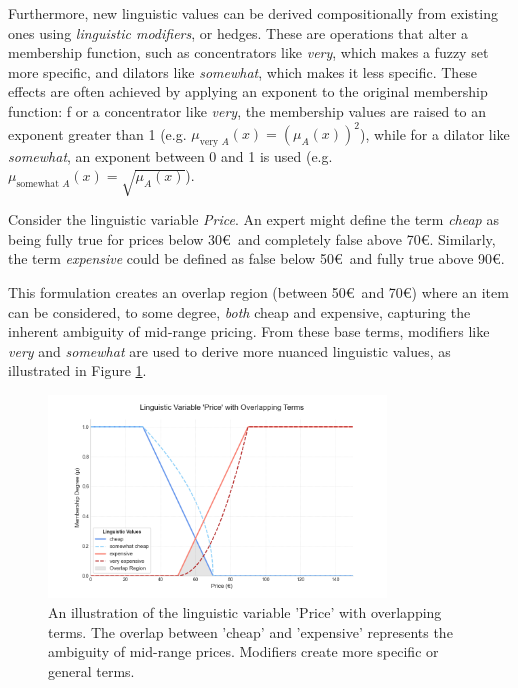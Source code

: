 Furthermore, new linguistic values can be derived compositionally from existing ones using \emph{linguistic modifiers}, or hedges. These are operations that alter a membership function, such as concentrators like \emph{very}, which makes a fuzzy set more specific, and dilators like \emph{somewhat}, which makes it less specific. These effects are often achieved by applying an exponent to the original membership function: f
or a concentrator like \emph{very}, the membership values are raised to an exponent greater than 1 (e.g. $\mu_{\text{very } A}(x) = (\mu_A(x))^2$), while for a dilator like \emph{somewhat}, an exponent between 0 and 1 is used (e.g. $\mu_{\text{somewhat } A}(x) = \sqrt{\mu_A(x)}$).

\begin{example}
    Consider the linguistic variable \emph{Price}. An expert might define the term \emph{cheap} as being fully true for prices below 30\euro$\,$ and completely false above 70\euro. Similarly, the term \emph{expensive} could be defined as false below 50\euro$\,$ and fully true above 90\euro. 
    
    This formulation creates an overlap region (between 50\euro$\,$ and 70\euro) where an item can be considered, to some degree, \emph{both} cheap and expensive, capturing the inherent ambiguity of mid-range pricing. From these base terms, modifiers like \emph{very} and \emph{somewhat} are used to derive more nuanced linguistic values, as illustrated in Figure \ref{fig:linguistic_variable_overlap}.
\end{example}

\begin{figure}[!ht]
    \centering
    \includegraphics[width=0.8\textwidth]{ch2/figures/fuzzy_var_car_example.png}
    \caption{An illustration of the linguistic variable 'Price' with overlapping terms. The overlap between 'cheap' and 'expensive' represents the ambiguity of mid-range prices. Modifiers create more specific or general terms.}
    \label{fig:linguistic_variable_overlap}
\end{figure}


